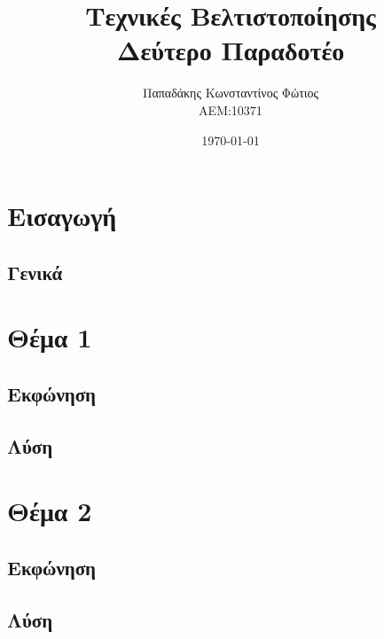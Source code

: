 \documentclass[twocolumn]{report}
\begin{document}

\title{\Huge \bfseries Τεχνικές Βελτιστοποίησης \\ Δεύτερο Παραδοτέο} %
\author{Παπαδάκης Κωνσταντίνος Φώτιος\vspace{0.5cm} \\  ΑΕΜ:10371} %
\date{\today}
\maketitle

\tableofcontents

\chapter{Εισαγωγή}
\section{Γενικά}


\chapter{Θέμα 1}
\section{Εκφώνηση}

\section{Λύση}


\chapter{Θέμα 2}
\section{Εκφώνηση}

\section{Λύση}


\end{document}
